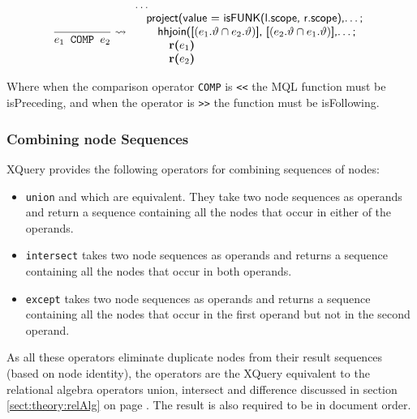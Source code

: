 \begin{equation*}
\frac{}{e_1 \mbox{\texttt{ COMP }} e_2} \leadsto
\begin{array}{l}
\mbox{\textsf{\ldots}} \\ \quad
\mbox{\textsf{project(value = isFUNK(l.scope, r.scope),\ldots;}} \\ \quad\quad
\mbox{\textsf{hhjoin([}}(e_1.\vartheta\cap e_2.\vartheta)\mbox{\textsf{], [}}(e_2.\vartheta\cap e_1.\vartheta)
\mbox{\textsf{],\ldots;}} \\ \quad\quad \quad
\mbox{\textbf{r(}}e_1\mbox{\textbf{)}} \\ \quad\quad \quad
\mbox{\textbf{r(}}e_2\mbox{\textbf{)}}
\end{array}
\end{equation*}

Where when the comparison operator \texttt{COMP} is \texttt{<<} the MQL function must be \textsf{isPreceding}, and
when the operator is \texttt{>>} the function must be \textsf{isFollowing}.

\subsubsection{Combining node Sequences}

XQuery provides the following operators for combining sequences of nodes:
\begin{itemize}
  \item \texttt{union} and \textbar which are equivalent. They take two node sequences as operands and return a
  sequence containing all the nodes that occur in either of the operands.
  \item \texttt{intersect} takes two node sequences as operands and returns a sequence containing all the
  nodes that occur in both operands.
  \item \texttt{except} takes two node sequences as operands and returns a sequence containing all the nodes
  that occur in the first operand but not in the second operand.
\end{itemize}

As all these operators eliminate duplicate nodes from their result sequences (based on node identity), the
operators are the XQuery equivalent to the relational algebra operators union, intersect and difference discussed
in section \ref{sect:theory:relAlg} on page \pageref{sect:theory:relAlg}. The result is also required to be in
document order.

